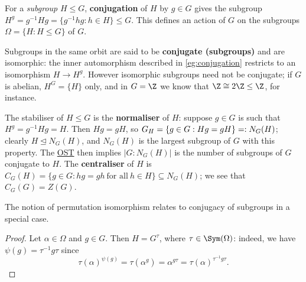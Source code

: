 \begin{example}\label{eg:conjugation_subgroups}
    For a \textit{subgroup} $H \leq G$, \textbf{conjugation} of $H$ by $g \in G$ gives the subgroup $H^g = g^{-1}Hg = \{g^{-1}hg : h \in H\} \leq G$. This defines an action of $G$ on the subgroups $\Omega = \{H : H \leq G\}$ of $G$.

    Subgroups in the same orbit are said to be \textbf{conjugate (subgroups)} and are isomorphic: the inner automorphism described in \autoref{eg:conjugation} restricts to an isomorphism $H \to H^g$. However isomorphic subgroups need not be conjugate; if $G$ is abelian, $H^G = \{H\}$ only, and in $G = \Z$ we know that $\Z \cong 2\Z \leq \Z$, for instance.

    The stabiliser of $H \leq G$ is the \textbf{normaliser} of $H$: suppose $g \in G$ is such that $H^g = g^{-1}H g = H$. Then $Hg = gH$, so $\added{2}{G_H} = \{g \in G : Hg = gH\} =: N_G(H)$; clearly $H \trianglelefteq N_G(H)$, and $N_G(H)$ is the largest subgroup of $G$ with this property. The \hyperref[thm:orbit_stabiliser]{OST} then implies $|G : N_G(H)|$ is the number of subgroups of $G$ conjugate to $H$. The \textbf{centraliser} of $H$ is $C_G(H) = \{g \in G : hg = gh\ \text{for all}\ h \in H\} \subseteq N_G(H)$; we see that $C_G(G) = Z(G)$.
\end{example}

The notion of permutation isomorphism relates to conjugacy of subgroups in a special case.


\begin{proof}
    Let $\alpha \in \Omega$ and $g \in G$. Then $H = G^\tau$, where $\tau \in \Sym(\Omega)$: indeed, we have $\psi(g) = \tau^{-1}g\tau$ since
    \[\tau(\alpha)^{\psi(g)} = \tau(\alpha^g) = \alpha^{g\tau} = \tau(\alpha)^{\tau^{-1}g\tau}.\]
\end{proof}



